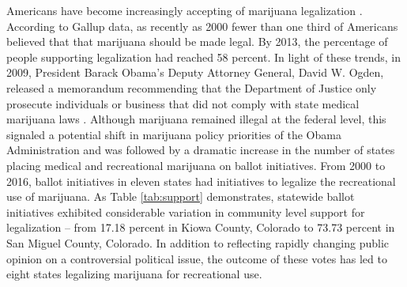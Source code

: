 Americans have become increasingly accepting of marijuana legalization \citep{caulkins_et_al_2012,rosenthal_and_kubby_1996,gallup_2013,pew_2013}. According to Gallup data, as recently as 2000 fewer than one third of Americans believed that that marijuana should be made legal. By 2013, the percentage of people supporting legalization had reached 58 percent. In light of these trends, in 2009, President Barack Obama's Deputy Attorney General, David W. Ogden, released a memorandum recommending that the Department of Justice only prosecute individuals or business that did not comply with state medical marijuana laws \citep{ogden_2009}. Although marijuana remained illegal at the federal level, this signaled a potential shift in marijuana policy priorities of the Obama Administration and was followed by a dramatic increase in the number of states placing medical and recreational marijuana on ballot initiatives. From 2000 to 2016, ballot initiatives in eleven states had initiatives to legalize the recreational use of marijuana. As Table \ref{tab:support} demonstrates, statewide ballot initiatives exhibited considerable variation in community level support for legalization -- from 17.18 percent in Kiowa County, Colorado to 73.73 percent in San Miguel County, Colorado. In addition to reflecting rapidly changing public opinion on a controversial political issue, the outcome of these votes has led to eight states legalizing marijuana for recreational use. 






